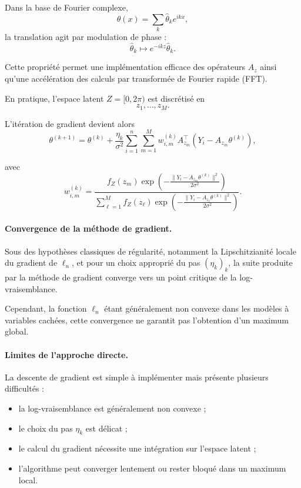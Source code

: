 \documentclass[12pt, a4paper]{article}
\theoremstyle{definition}
\begin{document}
Dans la base de Fourier complexe,
\[
\theta(x)=\sum_k \widehat{\theta}_k e^{ikx},
\]
la translation agit par modulation de phase :
\[
\widehat{\theta}_k
\longmapsto
e^{-ikz}\widehat{\theta}_k.
\]

Cette propriété permet une implémentation efficace des opérateurs $A_z$ ainsi qu’une accélération des calculs par transformée de Fourier rapide (FFT).

En pratique, l’espace latent $Z=[0,2\pi)$ est discrétisé en
\[
z_1,\dots,z_M.
\]

L’itération de gradient devient alors
\[
\theta^{(k+1)}
=
\theta^{(k)}
+
\frac{\eta_k}{\sigma^2}
\sum_{i=1}^n
\sum_{m=1}^M
w_{i,m}^{(k)}
A_{z_m}^\top
(Y_i-A_{z_m}\theta^{(k)}),
\]

avec
\[
w_{i,m}^{(k)}
=
\frac{
f_Z(z_m)
\exp\left(
-\frac{\|Y_i-A_{z_m}\theta^{(k)}\|^2}{2\sigma^2}
\right)
}{
\sum_{\ell=1}^M
f_Z(z_\ell)
\exp\left(
-\frac{\|Y_i-A_{z_\ell}\theta^{(k)}\|^2}{2\sigma^2}
\right)
}.
\]

\paragraph{Convergence de la méthode de gradient.}

Sous des hypothèses classiques de régularité, notamment la Lipschitzianité locale du gradient de $\ell_n$, et pour un choix approprié du pas $(\eta_k)_k$, la suite produite par la méthode de gradient converge vers un point critique de la log-vraisemblance.

Cependant, la fonction $\ell_n$ étant généralement non convexe dans les modèles à variables cachées, cette convergence ne garantit pas l’obtention d’un maximum global.

\paragraph{Limites de l’approche directe.}

La descente de gradient est simple à implémenter mais présente plusieurs difficultés :
\begin{itemize}
\item la log-vraisemblance est généralement non convexe ;
\item le choix du pas $\eta_k$ est délicat ;
\item le calcul du gradient nécessite une intégration sur l’espace latent ;
\item l’algorithme peut converger lentement ou rester bloqué dans un maximum local.
\end{itemize}
\end{document}
